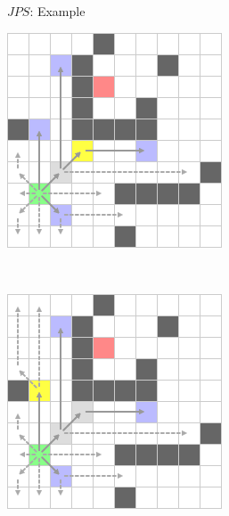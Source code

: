 \documentclass{presentation}
\begin{document}
\begin{frame}{$JPS$: Example}
\begin{minipage}{0.23\textwidth}
	\end{minipage}%
	\hfill%
	\begin{minipage}{0.23\textwidth}
		\includegraphics[width=\textwidth]{figures/jps_geschnitten/3.png}
	\end{minipage}\\
	\vspace{2mm}
	\begin{minipage}{0.23\textwidth}
		\includegraphics[width=\textwidth]{figures/jps_geschnitten/4.png}

\end{minipage}
\end{frame}
\end{document}
